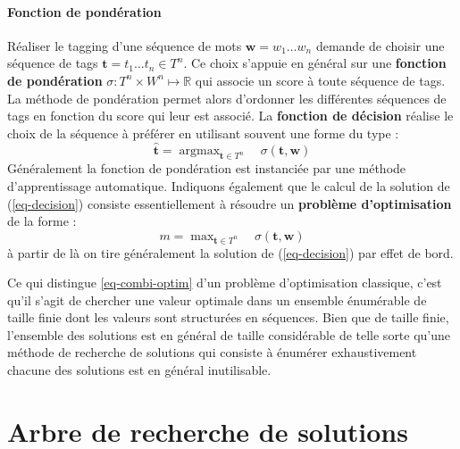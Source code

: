 \documentclass[11pt,openany]{book}
\newcommand{\kw}[1]{{\bf #1}} %
\begin{document}
\paragraph{Fonction de pondération}
Réaliser le tagging d'une séquence de mots $\mathbf{w} =  w_1\ldots w_n$ demande de choisir une séquence de tags $\mathbf{t} = t_1\ldots t_n \in T^n$. 
Ce  choix s'appuie en général sur une \kw{fonction de pondération} $\sigma : T^n\times W^n \mapsto \mathbb{R}$ qui associe un score à toute séquence de tags.
La méthode de pondération permet alors d'ordonner les différentes séquences de tags en fonction du score qui leur est associé.  La \kw{fonction de décision} réalise le choix de la séquence à préférer en utilisant souvent une forme du type :
\begin{equation}
\label{eq-decision}
\hat{\mathbf{t}} = \mathop{\text{argmax}}_{\mathbf{t} \in T^n}\quad \sigma(\mathbf{t},\mathbf{w})
\end{equation}
Généralement la fonction de pondération est instanciée par une méthode d'apprentissage automatique. Indiquons également que le calcul de la solution de (\ref{eq-decision})  consiste essentiellement à résoudre un \kw{problème d'optimisation} de la forme :
\begin{equation}
\label{eq-combi-optim}
m = \mathop{\text{max}}_{\mathbf{t} \in T^n}\quad \sigma(\mathbf{t},\mathbf{w})
\end{equation}
à partir de là on tire généralement la solution de (\ref{eq-decision}) 
par effet de bord.

Ce qui distingue \ref{eq-combi-optim} d'un problème d'optimisation classique,
c'est qu'il s'agit de chercher une valeur optimale dans un ensemble énumérable de taille finie dont les valeurs sont structurées en séquences.
Bien que de taille finie, l'ensemble des solutions est en général de taille considérable de telle sorte qu'une méthode de recherche de solutions qui consiste à énumérer exhaustivement chacune des solutions est en général inutilisable.


\section{Arbre de recherche de solutions}
\end{document}
